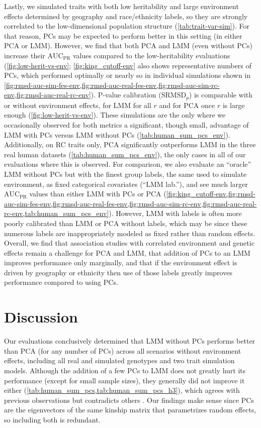 \documentclass[11pt]{article}
\newcommand{\rmsd}{\text{SRMSD}_p}
\newcommand{\auc}{\text{AUC}_\text{PR}}
\begin{document}
\begin{linenumbers}
Lastly, we simulated traits with both low heritability and large environment effects determined by geography and race/ethnicity labels, so they are strongly correlated to the low-dimensional population structure (\cref{tab:trait-var-sim}).
For that reason, PCs may be expected to perform better in this setting (in either PCA or LMM).
However, we find that both PCA and LMM (even without PCs) increase their $\auc$ values compared to the low-heritability evaluations (\cref{fig:low-herit-vs-env}; \cref{fig:king_cutoff-env} also shows representative numbers of PCs, which performed optimally or nearly so in individual simulations shown in \cref{fig:rmsd-auc-sim-fes-env,fig:rmsd-auc-real-fes-env,fig:rmsd-auc-sim-rc-env,fig:rmsd-auc-real-rc-env}).
P-value calibration ($\rmsd$) is comparable with or without environment effects, for LMM for all $r$ and for PCA once $r$ is large enough (\cref{fig:low-herit-vs-env}).
These simulations are the only where we occasionally observed for both metrics a significant, though small, advantage of LMM with PCs versus LMM without PCs (\cref{tab:human_sum_pcs_env}).
Additionally, on RC traits only, PCA significantly outperforms LMM in the three real human datasets (\cref{tab:human_sum_pcs_env}), the only cases in all of our evaluations where this is observed.
For comparison, we also evaluate an ``oracle'' LMM without PCs but with the finest group labels, the same used to simulate environment, as fixed categorical covariates (``LMM lab.''), and see much larger $\auc$ values than either LMM with PCs or PCA (\cref{fig:king_cutoff-env,fig:rmsd-auc-sim-fes-env,fig:rmsd-auc-real-fes-env,fig:rmsd-auc-sim-rc-env,fig:rmsd-auc-real-rc-env,tab:human_sum_pcs_env}).
However, LMM with labels is often more poorly calibrated than LMM or PCA without labels, which may be since these numerous labels are inappropriately modeled as fixed rather than random effects.
Overall, we find that association studies with correlated environment and genetic effects remain a challenge for PCA and LMM, that addition of PCs to an LMM improves performance only marginally, and that if the environment effect is driven by geography or ethnicity then use of those labels greatly improves performance compared to using PCs.

\section{Discussion}

Our evaluations conclusively determined that LMM without PCs performs better than PCA (for any number of PCs) across all scenarios without environment effects, including all real and simulated genotypes and two trait simulation models.
Although the addition of a few PCs to LMM does not greatly hurt its performance (except for small sample sizes), they generally did not improve it either (\cref{tab:human_sum_pcs,tab:human_sum_pcs_h3}), which agrees with previous observations \citep{liu_controlling_2011, janss_inferences_2012} but contradicts others \citep{zhao_arabidopsis_2007, price_new_2010}.
Our findings make sense since PCs are the eigenvectors of the same kinship matrix that parametrizes random effects, so including both is redundant.


\end{linenumbers}
\end{document}
